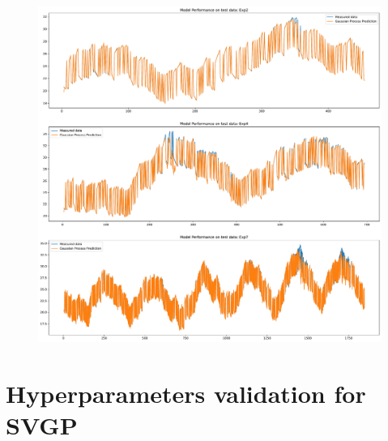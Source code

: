 \begin{figure}[ht]
    \centering
    \includegraphics[width = \textwidth]{Plots/GP_313_test_performance.pdf}
    \caption{}
    \label{fig:GP_313_test_validation}
\end{figure}


\clearpage

\section{Hyperparameters validation for SVGP}\label{apx:hyperparams_svgp}

\subsection{\texorpdfstring{}{123}}


